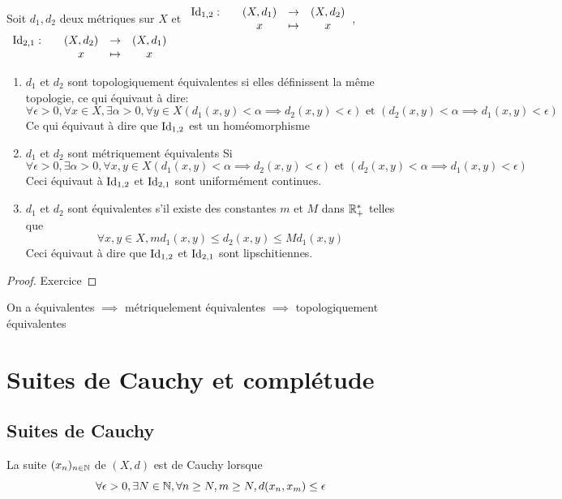 \documentclass[]{report}
\begin{document}
    \begin{dfprop}{}{}
        Soit $d_1,d_2$ deux métriques sur $X$ et $\begin{array}{ccccc} \text{Id}_{1,2} : & & (X,d_1) & \to & (X,d_2) \\ & & x & \mapsto & x \end{array}$, $\begin{array}{ccccc} \text{Id}_{2,1} : & & (X,d_2) & \to & (X,d_1) \\ & & x & \mapsto & x \end{array}$
        \begin{enumerate}
            \item $d_1$ et $d_2$ sont topologiquement équivalentes si elles définissent la même topologie, ce qui équivaut à dire:
            \[\forall \epsilon>0,\forall x\in X,\exists\alpha>0,\forall y\in X(d_1(x,y)<\alpha\implies d_2(x,y)<\epsilon)\text{ et }(d_2(x,y)<\alpha\implies d_1(x,y)<\epsilon)\]
            Ce qui équivaut à dire que $\text{Id}_{1,2}$ est un homéomorphisme
            \item $d_1$ et $d_2$ sont métriquement équivalents Si
            \[\forall \epsilon>0,\exists\alpha > 0,\forall x,y\in X(d_1(x,y)<\alpha\implies d_2(x,y)<\epsilon)\text{ et }(d_2(x,y)<\alpha\implies d_1(x,y)<\epsilon)\]
            Ceci équivaut à $\text{Id}_{1,2}$ et $\text{Id}_{2,1}$ sont uniformément continues.
            \item $d_1$ et $d_2$ sont équivalentes s'il existe des constantes $m$ et $M$ dans $\mathbb{R}_+^*$ telles que
            \[\forall x,y\in X,md_1(x,y)\le d_2(x,y)\le Md_1(x,y)\]
            Ceci équivaut à dire que $\text{Id}_{1,2}$ et $\text{Id}_{2,1}$ sont lipschitiennes.
        \end{enumerate}
    \end{dfprop}

    \begin{proof}
        Exercice
    \end{proof}

    \begin{re}{}{}
        On a équivalentes $\implies$ métriquelement équivalentes $\implies$ topologiquement équivalentes
    \end{re}

    \section{Suites de Cauchy et complétude}

    \subsection*{Suites de Cauchy}

    \begin{df}{}{}
        La suite $(x_n)_{n\in \mathbb{N}}$ de $(X,d)$ est de Cauchy lorsque
        \[\forall \epsilon >0,\exists N\in \mathbb{N},\forall n\ge N,m\ge N, d(x_n,x_m)\le \epsilon\]
    \end{df}
\end{document}
